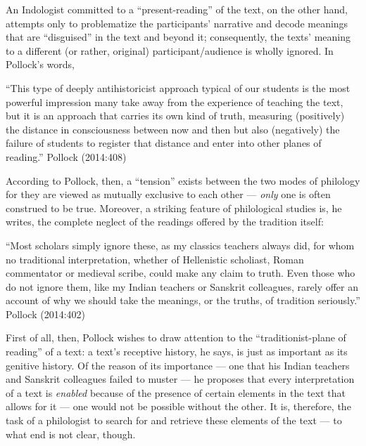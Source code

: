 An Indologist committed to a “present-reading” of the text, on the other hand, attempts only to problematize the participants’ narrative and decode meanings that are “disguised” in the text and beyond it; consequently, the texts’ meaning to a different (or rather, original) participant/audience is wholly ignored. In Pollock’s words, 

\begin{myquote}
“This type of deeply antihistoricist approach typical of our students is the most powerful impression many take away from the experience of teaching the text, but it is an approach that carries its own kind of truth, measuring (positively) the distance in consciousness between now and then but also (negatively) the failure of students to register that distance and enter into other planes of reading.”
\hfill Pollock (2014:408)
\end{myquote}

According to Pollock, then, a “tension” exists between the two modes of philology for they are viewed as mutually exclusive to each other --- {\sl only} one is often construed to be true. Moreover, a striking feature of philological studies is, he writes, the complete neglect of the readings offered by the tradition itself: 

\begin{myquote}
“Most scholars simply ignore these, as my classics teachers always did, for whom no traditional interpretation, whether of Hellenistic scholiast, Roman commentator or medieval scribe, could make any claim to truth. Even those who do not ignore them, like my Indian teachers or Sanskrit colleagues, rarely offer an account of why we should take the meanings, or the truths, of tradition seriously.”  			       		     						    
\hfill Pollock (2014:402)
\end{myquote}

First of all, then, Pollock wishes to draw attention to the “traditionist-plane of reading” of a text: a text’s receptive history, he says, is just as important as its genitive history. Of the reason of its importance --- one that his Indian teachers and Sanskrit colleagues failed to muster --- he proposes that every interpretation of a text is {\sl enabled} because of the presence of certain elements in the text that allows for it --- one would not be possible without the other. It is, therefore, the task of a philologist to search for and retrieve these elements of the text --- to what end is not clear, though. 

